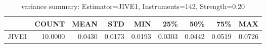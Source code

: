 \begin{table}[ht]
\centering
\caption{variance summary: Estimator=JIVE1, Instruments=142, Strength=0.20}
\begin{tabular}{lrrrrrrrr}
\toprule
 & COUNT & MEAN & STD & MIN & 25\% & 50\% & 75\% & MAX \\
\midrule
JIVE1 & 10.0000 & 0.0430 & 0.0173 & 0.0193 & 0.0303 & 0.0442 & 0.0519 & 0.0726 \\
\bottomrule
\end{tabular}
\end{table}
